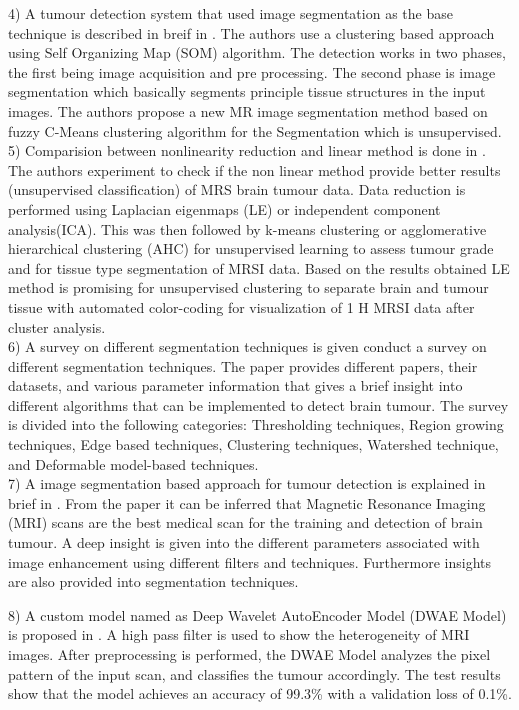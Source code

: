 4) A tumour detection system that used image segmentation as the base technique is described in breif in \cite{ref5}. The authors use a clustering based approach using Self Organizing Map (SOM) algorithm. The detection works in two phases, the first being image acquisition and pre processing. The second phase is image segmentation which basically segments principle tissue structures in the input images. The authors propose a new MR image segmentation method based on fuzzy C-Means clustering algorithm for the Segmentation which is unsupervised. \\

5) Comparision between nonlinearity reduction and linear method is done in \cite{ref6}. The authors experiment to check if the non linear method provide better results (unsupervised classification) of MRS brain tumour data. Data reduction is performed using Laplacian eigenmaps (LE) or independent component analysis(ICA). This was then followed by k-means clustering or agglomerative hierarchical clustering (AHC) for unsupervised learning to assess tumour grade and for tissue type segmentation of MRSI data. Based on the results obtained LE method is promising for unsupervised clustering to separate brain and tumour tissue with automated color-coding for visualization of 1 H MRSI data after cluster analysis.\\

6) A survey on different segmentation techniques is given \cite{ref7} conduct a survey on different segmentation techniques. The paper provides different papers, their datasets, and various parameter information that gives a brief insight into different algorithms that can be implemented to detect brain tumour. The survey is divided into the following categories: Thresholding techniques, Region growing techniques, Edge based techniques, Clustering techniques, Watershed technique, and Deformable model-based techniques.\\

7) A image segmentation based approach for tumour detection is explained in brief in \cite{ref8}. From the paper it can be inferred that Magnetic Resonance Imaging (MRI) scans are the best medical scan for the training and detection of brain tumour. A deep insight is given into the different parameters associated with image enhancement using different filters and techniques. Furthermore insights are also provided into segmentation techniques.

8) A custom model named as Deep Wavelet AutoEncoder Model (DWAE Model) is proposed in \cite{ref9}. A high pass filter is used to show the heterogeneity of MRI images. After preprocessing is performed,  the DWAE Model analyzes the pixel pattern of the input scan, and classifies the tumour accordingly. The test results show that the model achieves an accuracy of 99.3\% with a validation loss of 0.1\%.
